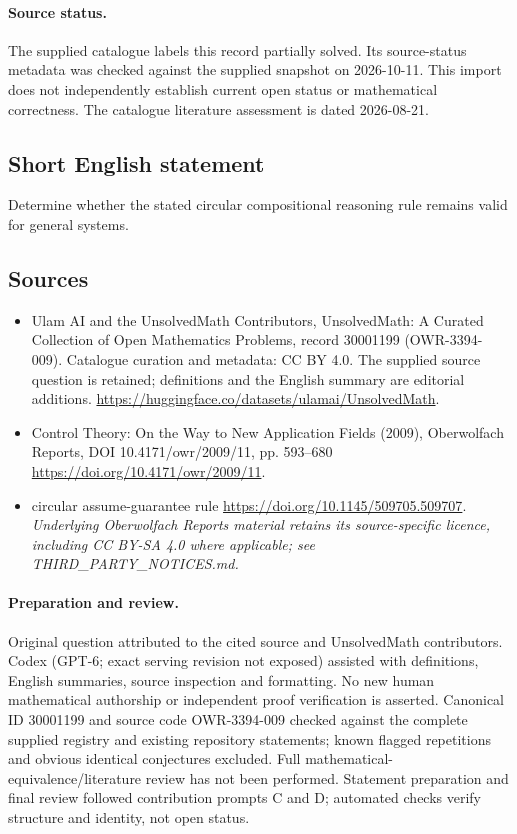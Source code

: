 \documentclass[11pt]{article}
\begin{document}
\paragraph{Source status.}
The supplied catalogue labels this record partially solved. Its source-status metadata was checked against the supplied snapshot on 2026-10-11. This import does not independently establish current open status or mathematical correctness. The catalogue literature assessment is dated 2026-08-21.
\subsection{Short English statement}
Determine whether the stated circular compositional reasoning rule remains valid for general systems.
\subsection{Sources}
\begin{itemize}
\item[S1] Ulam AI and the UnsolvedMath Contributors, UnsolvedMath: A Curated Collection of Open Mathematics Problems, record 30001199 (OWR-3394-009). Catalogue curation and metadata: CC BY 4.0. The supplied source question is retained; definitions and the English summary are editorial additions.
\url{https://huggingface.co/datasets/ulamai/UnsolvedMath}.
\item[S2] Control Theory: On the Way to New Application Fields (2009), Oberwolfach Reports, DOI 10.4171/owr/2009/11, pp. 593--680
\url{https://doi.org/10.4171/owr/2009/11}.
\item[S3] circular assume-guarantee rule
\url{https://doi.org/10.1145/509705.509707}.
\textit{Underlying Oberwolfach Reports material retains its source-specific licence, including CC BY-SA 4.0 where applicable; see THIRD\_PARTY\_NOTICES.md.}
\end{itemize}
\paragraph{Preparation and review.}
Original question attributed to the cited source and UnsolvedMath contributors. Codex (GPT-6; exact serving revision not exposed) assisted with definitions, English summaries, source inspection and formatting. No new human mathematical authorship or independent proof verification is asserted. Canonical ID 30001199 and source code OWR-3394-009 checked against the complete supplied registry and existing repository statements; known flagged repetitions and obvious identical conjectures excluded. Full mathematical-equivalence/literature review has not been performed. Statement preparation and final review followed contribution prompts C and D; automated checks verify structure and identity, not open status.
\label{end:30001199}
\end{document}

